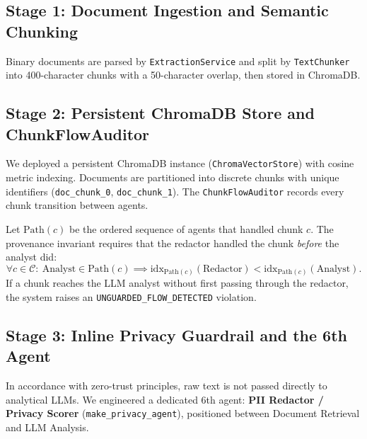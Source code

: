 \documentclass[11pt,a4paper]{article}
\begin{document}
\subsection{Stage 1: Document Ingestion and Semantic Chunking}
Binary documents are parsed by \texttt{ExtractionService} and split by \texttt{TextChunker} into 400-character chunks with a 50-character overlap, then stored in ChromaDB.

\subsection{Stage 2: Persistent ChromaDB Store and ChunkFlowAuditor}
We deployed a persistent ChromaDB instance (\texttt{ChromaVectorStore}) with cosine metric indexing. Documents are partitioned into discrete chunks with unique identifiers (\texttt{doc\_chunk\_0}, \texttt{doc\_chunk\_1}). The \texttt{ChunkFlowAuditor} records every chunk transition between agents.

Let $\text{Path}(c)$ be the ordered sequence of agents that handled chunk $c$. The provenance invariant requires that the redactor handled the chunk \emph{before} the analyst did:
\begin{equation}
\forall c \in \mathcal{C}:\ \text{Analyst} \in \text{Path}(c) \implies
\text{idx}_{\text{Path}(c)}(\text{Redactor}) < \text{idx}_{\text{Path}(c)}(\text{Analyst}).
\end{equation}
If a chunk reaches the LLM analyst without first passing through the redactor, the system raises an \texttt{UNGUARDED\_FLOW\_DETECTED} violation.

\subsection{Stage 3: Inline Privacy Guardrail and the 6th Agent}
In accordance with zero-trust principles, raw text is not passed directly to analytical LLMs. We engineered a dedicated 6th agent: \textbf{PII Redactor / Privacy Scorer} (\texttt{make\_privacy\_agent}), positioned between Document Retrieval and LLM Analysis.
\end{document}

